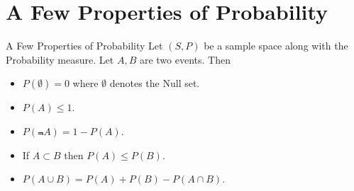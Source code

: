 \documentclass[compress]{beamer}
\begin{document}
\section{ A Few Properties of Probability}



\begin{frame}{A Few Properties of Probability}
Let $(S , P )$ be a sample space along with the Probability measure. Let $A, B$ are two events.  Then 
\begin{itemize}
\item $P(\emptyset)=0$ where $\emptyset$ denotes the Null set. 
\item $P(A)\leq 1$. 
\item $P(\Not{A})=1-P(A)$.
\item If $A\subset B $ then $P(A)\leq P(B) $.
\item  $P(A\cup B)= P(A)+P(B)-P(A\cap B)$. 
\end{itemize}

\vspace{2in}

\end{frame}


\begin{frame}
\vspace{-.2in}
 \vspace{.5in}
 
\end{frame}
\end{document}
